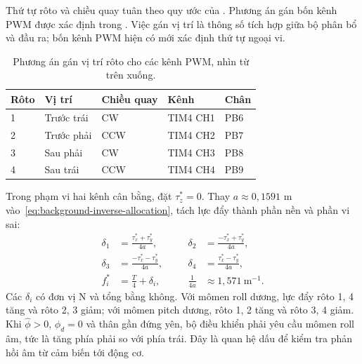 Thứ tự rôto và chiều quay tuân theo quy ước của . Phương án gán bốn kênh PWM được xác định trong . Việc gán vị trí là thông số tích hợp giữa bộ phân bổ và đầu ra; bốn kênh PWM hiện có mới xác định thứ tự ngoại vi.

\begin{table}[htbp]
	\centering
	\caption{Phương án gán vị trí rôto cho các kênh PWM, nhìn từ trên xuống.}
	\label{tab:design-motor-assignment}
	\begin{tabularx}{\linewidth}{|C{1.2cm}|Y|C{2.0cm}|C{2.3cm}|C{2.0cm}|}
		\hline
		\textbf{Rôto} & \textbf{Vị trí} & \textbf{Chiều quay} & \textbf{Kênh} & \textbf{Chân} \\
		             & Trước trái      & CW                  & TIM4 CH1      & PB6           \\
		             & Trước phải      & CCW                 & TIM4 CH2      & PB7           \\
		             & Sau phải        & CW                  & TIM4 CH3      & PB8           \\
		             & Sau trái        & CCW                 & TIM4 CH4      & PB9           \\
		\hline
	\end{tabularx}
\end{table}

Trong phạm vi hai kênh cân bằng, đặt $\tau_z^*=0$. Thay $a\approx0{,}1591$ m vào~\eqref{eq:background-inverse-allocation}, tách lực đẩy thành phần nền và phần vi sai:
\begin{equation}
	\begin{aligned}
		\delta_1     & =\frac{\tau_x^*+\tau_y^*}{4a},   &
		\delta_2     & =\frac{-\tau_x^*+\tau_y^*}{4a},    \\
		\delta_3     & =\frac{-\tau_x^*-\tau_y^*}{4a},  &
		\delta_4     & =\frac{\tau_x^*-\tau_y^*}{4a},     \\
		f_i^*        & =\frac{T}{4}+\delta_i,\qquad     &
		\frac{1}{4a} & \approx1{,}571\ \mathrm{m^{-1}}.
	\end{aligned}
	\label{eq:design-roll-pitch-allocation}
\end{equation}
Các $\delta_i$ có đơn vị N và tổng bằng không. Với mômen roll dương, lực đẩy rôto 1, 4 tăng và rôto 2, 3 giảm; với mômen pitch dương, rôto 1, 2 tăng và rôto 3, 4 giảm. Khi $\hat\phi>0$, $\phi_d=0$ và thân gần đứng yên, bộ điều khiển phải yêu cầu mômen roll âm, tức là tăng phía phải so với phía trái. Đây là quan hệ dấu để kiểm tra phản hồi âm từ cảm biến tới động cơ.

